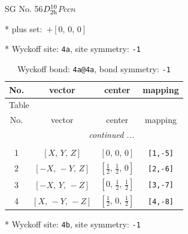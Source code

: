 \documentclass[fleqn,8pt]{jsarticle}
\begin{document}
\setcounter{MaxMatrixCols}{32}

\renewcommand{\tablename}{Table~}
\renewcommand{\figurename}{Figure~}
\begin{center}
\LARGE
SG No. 56\quad$D_{\rm 2h}^{10}$\quad$Pccn$\quad[ orthorhombic ]
\end{center}

* plus set:\,\,\,$+\left[ 0,\, 0,\, 0 \right]$


* Wyckoff site: {\tt 4a}, site symmetry: {\tt -1}
\renewcommand{\arraystretch}{1.2}
\begin{longtable}{cccc}
\caption{Wyckoff bond: {\tt 4a@4a}, bond symmetry: {\tt -1}}
 \\
 \hline \hline
No. & vector & center & mapping \\ \hline \endfirsthead

\multicolumn{3}{l}{\tablename\ \thetable{}} \\
 \hline \hline
No. & vector & center & mapping \\ \hline \endhead

 \hline \hline
\multicolumn{3}{r}{\footnotesize\it continued ...} \\ \endfoot

 \hline \hline
\multicolumn{3}{r}{} \\ \endlastfoot

1 & $\left[ X,\, Y,\, Z \right]$ & $\left[ 0,\, 0,\, 0 \right]$ & {\tt [1,-5]} \\ \hline
2 & $\left[ - X,\, - Y,\, Z \right]$ & $\left[ \frac{1}{2},\, \frac{1}{2},\, 0 \right]$ & {\tt [2,-6]} \\ \hline
3 & $\left[ - X,\, Y,\, - Z \right]$ & $\left[ 0,\, \frac{1}{2},\, \frac{1}{2} \right]$ & {\tt [3,-7]} \\ \hline
4 & $\left[ X,\, - Y,\, - Z \right]$ & $\left[ \frac{1}{2},\, 0,\, \frac{1}{2} \right]$ & {\tt [4,-8]} \\
\end{longtable}
* Wyckoff site: {\tt 4b}, site symmetry: {\tt -1}
\renewcommand{\arraystretch}{1.2}
\end{document}
